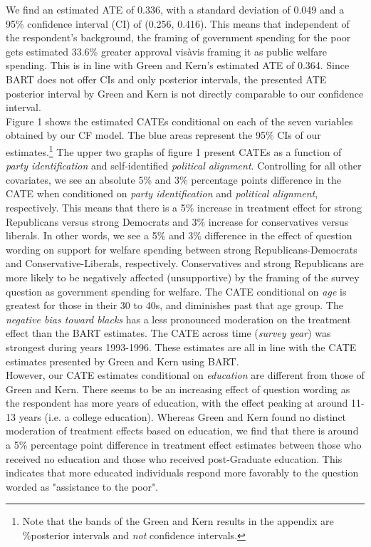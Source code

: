 \documentclass[12pt]{article}
\begin{document}
We find an estimated ATE of 0.336, with a standard deviation of 0.049 and a 95\%
confidence interval (CI) of (0.256, 0.416). This means that independent of the respondent's background, the framing of government spending for the poor gets estimated 33.6\% greater approval vis\-à\-vis framing it as public welfare spending. This is in line with Green and
Kern's estimated ATE of 0.364. Since BART does not offer CIs and only posterior
intervals, the presented ATE posterior interval by Green and Kern is not directly
comparable to our confidence interval. 
\\

Figure 1 shows the estimated CATEs conditional on each of the seven variables
obtained by our CF model. The blue areas represent the 95\% CIs of our
estimates.\footnote{Note that the bands of the Green and Kern results in the appendix are \%posterior intervals and \textit{not} confidence intervals.}
The upper two graphs of figure 1 present CATEs as a function of \textit{party
identification} and self-identified \textit{political alignment}. Controlling
for all other covariates, we see an absolute 5\% and 3\% percentage points
difference in the CATE when conditioned on \textit{party identification} and
\textit{political alignment}, respectively. This means that there is a 5\%
increase in treatment effect for strong Republicans versus strong Democrats and
3\% increase for conservatives versus liberals. In other words, we see a 5\% and
3\% difference in the effect of question wording on support for welfare spending
between strong Republicans-Democrats and Conservative-Liberals, respectively.
Conservatives and strong Republicans are more likely to be negatively affected
(unsupportive) by the framing of the survey question as government spending for
welfare. The CATE conditional on \textit{age} is greatest for those in their 30
to 40s, and diminishes past that age group. The \textit{negative bias toward
blacks} has a less pronounced moderation on the treatment effect than the BART
estimates. The CATE across time (\textit{survey year}) was strongest during
years 1993-1996. These estimates are all in line with the CATE estimates
presented by Green and Kern using BART. \\

However, our CATE estimates conditional on \textit{education} are different from
those of Green and Kern. There seems to be an increasing effect of question
wording as the respondent has more years of education, with the effect peaking
at around 11-13 years (i.e. a college education). Whereas Green and Kern found
no distinct moderation of treatment effects based on education, we find that
there is around a 5\% percentage point difference in treatment effect estimates
between those who received no education and those who received post-Graduate
education. This indicates that more educated individuals respond more favorably
to the question worded as "assistance to the poor". \\
\end{document}
